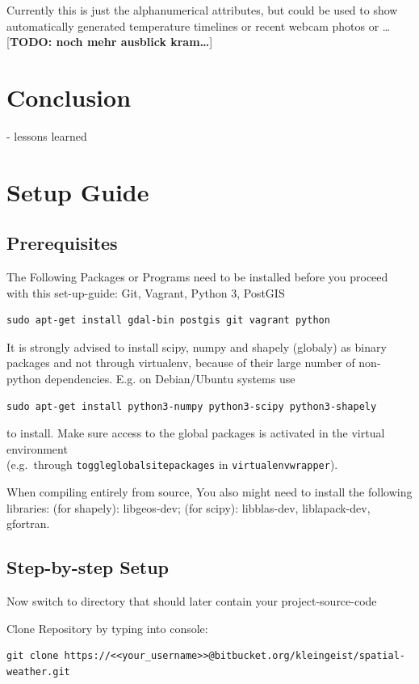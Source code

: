 \documentclass[paper=a4, fontsize=11pt]{scrartcl} %
\numberwithin{equation}{section} %
\numberwithin{figure}{section} %
\numberwithin{table}{section} %
\begin{document}
Currently this is just the alphanumerical attributes, but could be used
to show automatically generated temperature timelines or recent webcam
photos or \ldots{} {[}\textbf{TODO: noch mehr ausblick kram\ldots{}}{]}

\section{Conclusion}
	- lessons learned

\section{Setup Guide}
\subsection{Prerequisites}

The Following Packages or Programs need to be installed before you proceed with this set-up-guide: Git, Vagrant, Python 3, PostGIS

\begin{lstlisting}
sudo apt-get install gdal-bin postgis git vagrant python
\end{lstlisting}

It is strongly advised to install scipy, numpy and shapely (globaly) as
binary packages and not through virtualenv, because of their large
number of non-python dependencies. E.g. on Debian/Ubuntu systems use
\begin{lstlisting}
sudo apt-get install python3-numpy python3-scipy python3-shapely
\end{lstlisting}
to install. Make sure access to the global packages is activated in the
virtual environment\\(e.g.~through \texttt{toggleglobalsitepackages} in
\texttt{virtualenvwrapper}).

When compiling entirely from source, You also might need to install the
following libraries: (for shapely): libgeos-dev; (for scipy):
libblas-dev, liblapack-dev, gfortran.

\subsection{Step-by-step Setup}
Now switch to directory that should later contain your project-source-code

Clone Repository by typing into console:
\begin{lstlisting}
git clone https://<<your_username>>@bitbucket.org/kleingeist/spatial-weather.git
\end{lstlisting}
\end{document}
